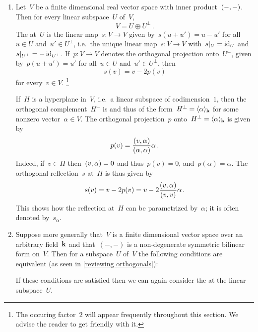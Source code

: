 \begin{recall}
  \leavevmode
  \begin{enumerate}
    \item
      Let~$V$ be a finite dimensional real vector space with inner product~$(-,-)$.
      Then for every linear subspace~$U$ of~$V$,
      \[
        V
        =
        U \oplus U^\perp \,.
      \]
      The  at~$U$ is the linear map~$s \colon V \to V$ given by~$s(u + u') = u - u'$ for all~$u \in U$ and~$u' \in U^\perp$, i.e.\ the unique linear map~$s \colon V \to V$ with~$\restrict{s}{U} = \id_U$ and~$\restrict{s}{U^\perp} = - \id_{U^\perp}$.
      If~$p \colon V \to V$ denotes the orthogonal projection onto~$U^\perp$, given by~$p(u + u') = u'$ for all~$u \in U$ and~$u' \in U^\perp$, then
      \[
        s(v)
        =
        v - 2 p(v)
      \]
      for every~$v \in V$.%
      \footnote{The occuring factor~$2$ will appear frequently throughout this section.
      We advise the reader to get friendly with it.}
      
      If~$H$ is a hyperplane in~$V$, i.e.\ a linear subspace of codimension~$1$, then the orthogonal complement~$H^\perp$ is {\onedimensional} and thus of the form~$H^\perp = \langle\alpha\rangle_{\mathbf{k}}$ for some nonzero vector~$\alpha \in V$.
      The orthogonal projection~$p$ onto~$H^\perp = \langle\alpha\rangle_{\mathbf{k}}$ is given by
      \[
        p(v)
        =
        \frac{(v,\alpha)}{(\alpha,\alpha)} \alpha \,.
      \]
      Indeed, if~$v \in H$ then~$(v,\alpha) = 0$ and thus~$p(v) = 0$, and~$p(\alpha) = \alpha$.
      The orthogonal reflection~$s$ at~$H$ is thus given by
      \[
        s(v)
        =
        v - 2 p(v)
        =
        v - 2 \frac{(v,\alpha)}{(v,v)} \alpha \,.
      \]
      This shows how the reflection at~$H$ can be parametrized by~$\alpha$;
      it is often denoted by~$s_\alpha$.
    \item
      Suppose more generally that~$V$ is a finite dimensional vector space over an arbitrary field~$\mathbf{k}$ and that~$(-,-)$ is a non-degenerate symmetric bilinear form on~$V$.
      Then for a subspace~$U$ of~$V$ the following conditions are equivalent (as seen in \cref{reviewing orthogonals}):
      If these conditions are satisfied then we can again consider the  at the linear subspace~$U$.
      

\end{enumerate}
\end{recall}
